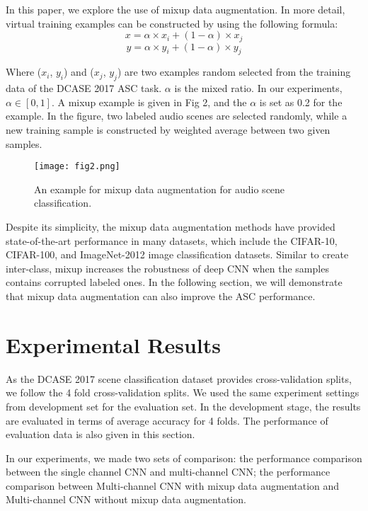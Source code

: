 \documentclass[conference]{IEEEtran}
\begin{document}
In this paper, we explore the use of mixup data augmentation. In more detail, virtual training examples can be constructed by using the following formula:
\begin{equation}
x=\alpha \times x_i + (1-\alpha) \times x_j
\end{equation}
\begin{equation}
y=\alpha \times y_i + (1-\alpha) \times y_j
\end{equation}

Where ($x_i$, $y_i$) and ($x_j$, $y_j$) are two examples random selected from the training data of the DCASE 2017 ASC task. $\alpha$ is the mixed ratio. In our experiments, $\alpha \in [0,1]$. A mixup example is given in Fig 2, and the $\alpha$ is set as 0.2 for the example. In the figure, two labeled audio scenes are selected randomly, while a new training sample is constructed by weighted average between two given samples.

\begin{figure}[!ht]
	\centering
	\texttt{[image: fig2.png]}
	\caption{An example for mixup data augmentation for audio scene classification.}
	\label{fig2}
\end{figure}

Despite its simplicity, the mixup data augmentation methods have provided state-of-the-art performance in many datasets, which include the CIFAR-10, CIFAR-100, and ImageNet-2012 image classification datasets. Similar to create inter-class, mixup increases the robustness of deep CNN when the samples contains corrupted labeled ones. In the following section, we will demonstrate that mixup data augmentation can also improve the ASC performance.

\section{Experimental Results}\label{ER}

As the DCASE 2017 scene classification dataset provides cross-validation splits, we follow the 4 fold cross-validation splits. We used the same experiment settings from development set for the evaluation set. In the development stage, the results are evaluated in terms of average accuracy for 4 folds. The performance of evaluation data is also given in this section.

In our experiments, we made two sets of comparison: the performance comparison between the single channel CNN and multi-channel CNN; the performance comparison between Multi-channel CNN with mixup data augmentation and Multi-channel CNN without mixup data augmentation.
\end{document}
